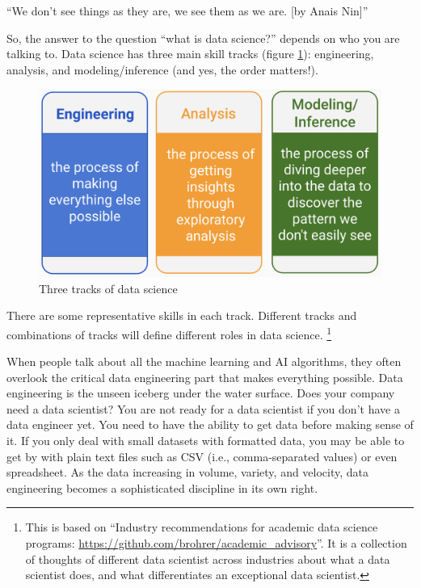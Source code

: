\documentclass[
  12pt,
]{krantz}
\renewenvironment{quote}{\begin{VF}}{\end{VF}}
\begin{document}
\begin{quote}
``We don't see things as they are, we see them as we are. {[}by Anais Nin{]}''
\end{quote}

So, the answer to the question ``what is data science?'' depends on who you are talking to. Data science has three main skill tracks (figure \ref{fig:threetracks}): engineering, analysis, and modeling/inference (and yes, the order matters!).

\begin{figure}

{\centering \includegraphics[width=0.8\linewidth]{images/threetracks} 

}

\caption{Three tracks of data science}\label{fig:threetracks}
\end{figure}

There are some representative skills in each track. Different tracks and combinations of tracks will define different roles in data science. \footnote{This is based on ``Industry recommendations for academic data science programs: \url{https://github.com/brohrer/academic_advisory}''. It is a collection of thoughts of different data scientist across industries about what a data scientist does, and what differentiates an exceptional data scientist.}

When people talk about all the machine learning and AI algorithms, they often overlook the critical data engineering part that makes everything possible. Data engineering is the unseen iceberg under the water surface. Does your company need a data scientist? You are not ready for a data scientist if you don't have a data engineer yet. You need to have the ability to get data before making sense of it. If you only deal with small datasets with formatted data, you may be able to get by with plain text files such as CSV (i.e., comma-separated values) or even spreadsheet. As the data increasing in volume, variety, and velocity, data engineering becomes a sophisticated discipline in its own right.
\end{document}
